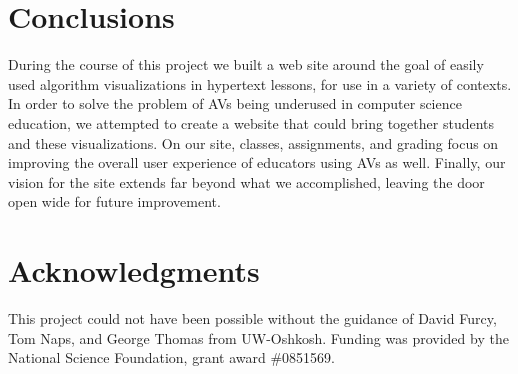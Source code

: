 \documentclass{acm_proc_article-sp}
\begin{document}
\section{Conclusions}
During the course of this project we built a web site around the goal of easily used algorithm visualizations in hypertext lessons, for use in a variety of contexts. In order to solve the problem of AVs being underused in computer science education, we attempted to create a website that could bring together students and these visualizations. On our site, classes, assignments, and grading focus on improving the overall user experience of educators using AVs as well. Finally, our vision for the site extends far beyond what we accomplished, leaving the door open wide for future improvement.

\section{Acknowledgments}
This project could not have been possible without the guidance of David Furcy, Tom Naps, and George Thomas from UW-Oshkosh. Funding was provided by the National Science Foundation, grant award \#0851569.


%
%
\balancecolumns

\end{document}
